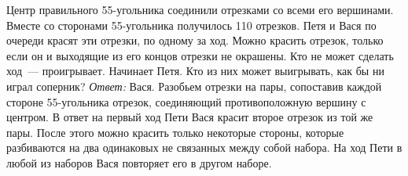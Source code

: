 \problem
Центр правильного 55-угольника соединили отрезками со всеми его вершинами.
Вместе со сторонами 55-угольника получилось 110 отрезков.
Петя и Вася по очереди красят эти отрезки, по одному за ход.
Можно красить отрезок, только если он и выходящие из его концов отрезки не
окрашены.
Кто не может сделать ход~--- проигрывает.
Начинает Петя.
Кто из них может выигрывать, как бы ни играл соперник?
\solution
\emph{Ответ:} Вася.
Разобьем отрезки на пары, сопоставив каждой стороне 55-уголь\-ника отрезок,
соединяющий противоположную вершину с центром.
В ответ на первый ход Пети Вася красит второе отрезок из той же пары.
После этого можно красить только некоторые стороны, которые разбиваются на два
одинаковых не связанных между собой набора.
На ход Пети в любой из наборов Вася повторяет его в другом наборе.
\endproblem
